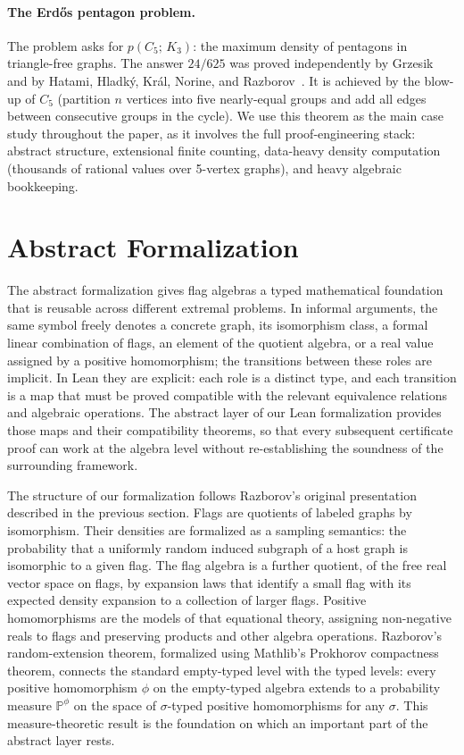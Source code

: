 \documentclass{article}
\newcommand{\tdensity}[2]{p(#1;\,#2)}
\begin{document}
\paragraph{The Erd\H{o}s pentagon problem.}
The problem asks for $\tdensity{C_5}{K_3}$: the maximum density of
pentagons in triangle-free graphs.  The answer $24/625$ was proved
independently by Grzesik~\cite{grzesik2012} and by Hatami, Hladk\'y, Kr\'al,
Norine, and Razborov~\cite{hatami2012}.  It is achieved by the blow-up of
$C_5$ (partition $n$ vertices into five nearly-equal groups and add all edges
between consecutive groups in the cycle).  We use this theorem as the main
case study throughout the paper, as it involves the full proof-engineering
stack: abstract structure, extensional finite counting, data-heavy density
computation (thousands of rational values over 5-vertex graphs), and heavy
algebraic bookkeeping.


\section{Abstract Formalization}
\label{sec:abstract}

The abstract formalization gives flag algebras a typed mathematical foundation
that is reusable across different extremal problems.  In informal arguments,
the same symbol freely denotes a concrete graph, its isomorphism class, a
formal linear combination of flags, an element of the quotient algebra, or a
real value assigned by a positive homomorphism; the transitions between these
roles are implicit.  In Lean they are explicit: each role is a distinct type,
and each transition is a map that must be proved compatible with the relevant
equivalence relations and algebraic operations.  The abstract layer 
of our Lean formalization provides
those maps and their compatibility theorems, so that every subsequent
certificate proof can work at the algebra level without re-establishing the
soundness of the surrounding framework.

The structure of our formalization follows Razborov's original presentation described in the previous section.  Flags are
quotients of labeled graphs by isomorphism.  Their densities are formalized as
a sampling semantics: the probability that a uniformly random induced subgraph
of a host graph is isomorphic to a given flag.  The flag algebra is a further
quotient, of the free real vector space on flags, by expansion laws that
identify a small flag with its expected density expansion to a collection 
of larger flags.
Positive homomorphisms are the models of that equational theory, assigning
non-negative reals to flags and preserving products and other algebra operations.  
Razborov's random-extension theorem, formalized using Mathlib's Prokhorov compactness
theorem, connects the standard empty-typed level with the typed levels: 
every positive homomorphism $\phi$ on
the empty-typed algebra extends to a probability measure $\mathbb{P}^{\phi}$ on the space 
of $\sigma$-typed positive homomorphisms for any $\sigma$.  
This measure-theoretic result is the foundation on
which an important part of the abstract layer rests.
\end{document}
